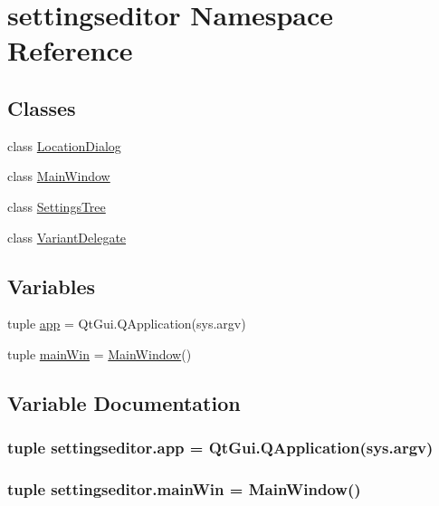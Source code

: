 \hypertarget{namespacesettingseditor}{}\section{settingseditor Namespace Reference}
\label{namespacesettingseditor}
\subsection*{Classes}
\begin{DoxyCompactItemize}
\item 
class \hyperlink{classsettingseditor_1_1LocationDialog}{Location\+Dialog}
\item 
class \hyperlink{classsettingseditor_1_1MainWindow}{Main\+Window}
\item 
class \hyperlink{classsettingseditor_1_1SettingsTree}{Settings\+Tree}
\item 
class \hyperlink{classsettingseditor_1_1VariantDelegate}{Variant\+Delegate}
\end{DoxyCompactItemize}
\subsection*{Variables}
\begin{DoxyCompactItemize}
\item 
tuple \hyperlink{namespacesettingseditor_a5b72377e9160c68f5653904207a1d10e}{app} = Qt\+Gui.\+Q\+Application(sys.\+argv)
\item 
tuple \hyperlink{namespacesettingseditor_a2335d54b53f572aeebe06280e7f9e76b}{main\+Win} = \hyperlink{classsettingseditor_1_1MainWindow}{Main\+Window}()
\end{DoxyCompactItemize}


\subsection{Variable Documentation}
\hypertarget{namespacesettingseditor_a5b72377e9160c68f5653904207a1d10e}{}
\subsubsection[{app}]{\setlength{\rightskip}{0pt plus 5cm}tuple settingseditor.\+app = Qt\+Gui.\+Q\+Application(sys.\+argv)}\label{namespacesettingseditor_a5b72377e9160c68f5653904207a1d10e}
\hypertarget{namespacesettingseditor_a2335d54b53f572aeebe06280e7f9e76b}{}
\subsubsection[{main\+Win}]{\setlength{\rightskip}{0pt plus 5cm}tuple settingseditor.\+main\+Win = {\bf Main\+Window}()}\label{namespacesettingseditor_a2335d54b53f572aeebe06280e7f9e76b}
